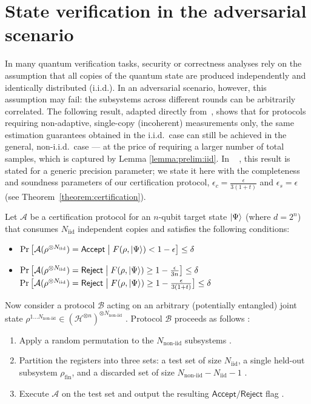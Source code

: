 \documentclass[a4paper,twocolumn,11pt,unpublished]{../../revision/quantumarticle}
\newcommand{\Accept}{\mathsf{Accept}}
\newcommand{\Reject}{\mathsf{Reject}}
\newcommand{\Niid}{N_{\mathrm{iid}}}
\newcommand{\Nnoniid}{N_{\mathrm{non\text{-}iid}}}
\providecommand{\DIFadd}[1]{{\protect\color{blue} \sf #1}} %
\providecommand{\DIFdel}[1]{{\protect\color{red} \scriptsize #1}} %
\providecommand{\DIFaddbegin}{} %
\providecommand{\DIFaddend}{} %
\providecommand{\DIFdelbegin}{} %
\providecommand{\DIFdelend}{} %
\begin{document}
\section{State verification in the adversarial scenario}
\label{section:verification}

In many quantum verification tasks, security or correctness analyses rely on the assumption that all copies of the quantum state are produced independently and identically distributed (i.i.d.).
In an adversarial scenario, however, this assumption may fail: the subsystems across different rounds can be arbitrarily correlated.
The following result, adapted directly from~\cite[Theorem~3]{FKMO24learning}, shows that for protocols requiring non-adaptive, single-copy (incoherent) measurements only, the same estimation guarantees obtained in the i.i.d.\ case can still be achieved in the general, non-i.i.d.\ case — at the price of requiring a larger number of total samples, which is captured by Lemma \ref{lemma:prelim:iid}. \DIFaddbegin \DIFadd{In \mbox{%
\cite{FKMO24learning}}\hskip0pt%
, this result is stated for a generic precision parameter; we state it here with the completeness and soundness parameters of our certification protocol, $\epsilon_c=\frac{\epsilon}{3(1+t)}$ and $\epsilon_s=\epsilon$ (see Theorem~\ref{theorem:certification}).
}\DIFaddend \begin{lemma}
\label{lemma:prelim:iid}
Let $\mathcal{A}$ be a certification protocol for an $n$-qubit target state $\ket{\Psi}$ (where $d=2^n$) that consumes $\Niid$ independent copies and satisfies the following conditions:

\begin{itemize}
    \item 
    $\Pr\left[\mathcal{A}(\rho^{\otimes \Niid}) = \Accept \; \middle|\;  F(\rho, \ket{\Psi}) < 1-\epsilon\right] \leq \delta$
    \item 
    \DIFdelbegin \DIFdel{$\Pr\left[\mathcal{A}(\rho^{\otimes \Niid}) = \Reject \; \middle|\;  F(\rho, \ket{\Psi}) \geq 1-\frac{\epsilon}{3n}\right] \leq \delta$ 
}\DIFdelend \DIFaddbegin \DIFadd{$\Pr\big[\mathcal{A}(\rho^{\otimes \Niid}) = \Reject \;\big|\;  F(\rho, \ket{\Psi}) \geq 1-\frac{\epsilon}{3(1+t)}\big] \leq \delta$ 
}\DIFaddend \end{itemize}

Now consider a protocol $\mathcal{B}$ acting on an arbitrary (potentially entangled) joint state $\rho^{1\ldots \Nnoniid} \in (\mathcal{H}^{\otimes n})^{\otimes \Nnoniid}$ . Protocol $\mathcal{B}$ proceeds as follows :
\begin{enumerate}
    \item Apply a random permutation to the $\Nnoniid$ subsystems .
    \item Partition the registers into three sets: a test set of size $\Niid$, a single held-out subsystem $\rho_{\mathrm{fin}}$, and a discarded set of size $\Nnoniid - \Niid - 1$ .
    \item Execute $\mathcal{A}$ on the test set and output the resulting $\Accept/\Reject$ flag .
\end{enumerate}


\end{lemma}
\end{document}
